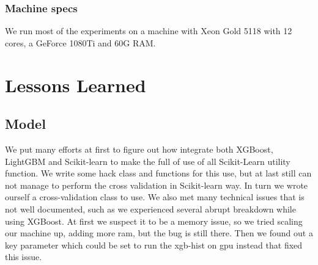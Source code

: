 \documentclass[runningheads]{llncs}
\begin{document}
\subsubsection{Machine specs}
We run most of the experiments on a machine with Xeon Gold 5118 with 12 cores, a GeForce 1080Ti and 60G RAM.

\section{Lessons Learned}

\subsection{Model}

We put many efforts at first to figure out how integrate both XGBoost, LightGBM and Scikit-learn to make the full of use of all Scikit-Learn utility function. We write some hack class and functions for this use, but at last still can not manage to perform the cross validation in Scikit-learn way. In turn we wrote ourself a cross-validation class to use. We also met many technical issues that is not well documented, such as we experienced several abrupt breakdown while using XGBoost. At first we suspect it to be a memory issue, so we tried scaling our machine up, adding more ram, but the bug is still there. Then we found out a key parameter which could be set to run the xgb-hist on gpu instead that fixed this issue.


%
%
%


%
\begin{thebibliography}{8}
\end{thebibliography}
\end{document}
